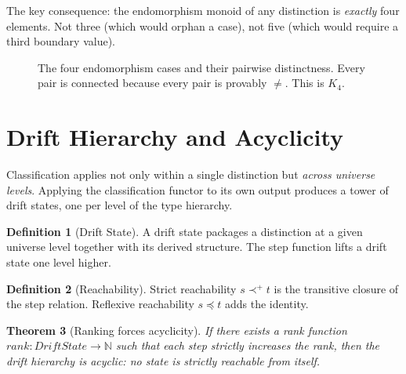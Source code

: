 \documentclass[11pt,a4paper]{article}
\newtheorem{theorem}{Theorem}[section]
\theoremstyle{definition}
\newtheorem{definition}[theorem]{Definition}
\begin{document}
The key consequence: the endomorphism monoid of any distinction is
\emph{exactly} four elements.  Not three (which would orphan a case),
not five (which would require a third boundary value).

\begin{figure}[h]
\centering
{}
\caption{The four endomorphism cases and their pairwise distinctness.  Every pair is connected because every pair is provably $\neq$.  This is $K_4$.}
\label{fig:k4-endo}
\end{figure}

\section{Drift Hierarchy and Acyclicity}
\label{sec:drift}

Classification applies not only within a single distinction but
\emph{across universe levels}.  Applying the classification functor to
its own output produces a tower of drift states, one per level of the
type hierarchy.

\begin{definition}[Drift State]
A drift state packages a distinction at a given universe level together
with its derived structure.  The step function lifts a drift state one
level higher.
\end{definition}

\begin{definition}[Reachability]
Strict reachability $s \prec^+ t$ is the transitive closure of the
step relation.  Reflexive reachability $s \preceq t$ adds the identity.
\end{definition}

\begin{theorem}[Ranking forces acyclicity]
\label{thm:acyclic}
If there exists a rank function $\mathit{rank} : \mathit{DriftState} \to
\mathbb{N}$ such that each step strictly increases the rank, then the
drift hierarchy is acyclic: no state is strictly reachable from itself.
\end{theorem}
\end{document}
